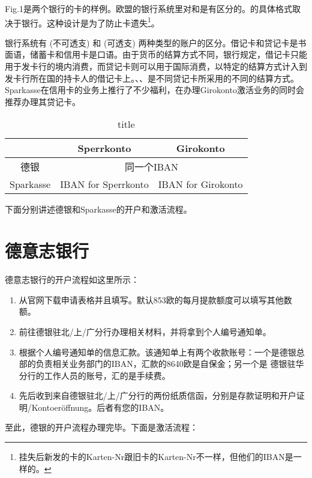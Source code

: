 Fig.1是两个银行的卡的样例。欧盟的银行系统里对和是有区分的。的具体格式取决于银行。这种设计是为了防止卡遗失\footnote{挂失后新发的卡的Karten-Nr跟旧卡的Karten-Nr不一样，但他们的IBAN是一样的。}。

银行系统有 (不可透支) 和 (可透支) 两种类型的账户的区分。借记卡和贷记卡是书面语，储蓄卡和信用卡是口语。由于货币的结算方式不同，银行规定，借记卡只能用于发卡行的境内消费，而贷记卡则可以用于国际消费，以特定的结算方式计入到发卡行所在国的持卡人的借记卡上。、、是不同贷记卡所采用的不同的结算方式。Sparkasse在信用卡的业务上推行了不少福利，在办理Girokonto激活业务的同时会推荐办理其贷记卡。

\begin{table}[h]
\centering
\caption{title}
\begin{tabular}{|c|c|c|}
\hline
&Sperrkonto&Girokonto\\
\hline
德银&\multicolumn{2}{c|}{同一个IBAN}\\
\hline
Sparkasse&IBAN for Sperrkonto&IBAN for Girokonto\\
\hline
\end{tabular}
\end{table}

下面分别讲述德银和Sparkasse的开户和激活流程。

\section{德意志银行}

德意志银行的开户流程如这里所示：

\begin{enumerate}
  \item 从官网下载申请表格并且填写。默认853欧的每月提款额度可以填写其他数额。
  \item 前往德银驻北/上/广分行办理相关材料，并将拿到个人编号通知单。
  \item 根据个人编号通知单的信息汇款。该通知单上有两个收款账号：一个是德银总部的负责相关业务部门的IBAN，汇款的8640欧是自保金；另一个是 德银驻华分行的工作人员的账号，汇的是手续费。
  \item 先后收到来自德银驻北/上/广分行的两份纸质信函，分别是存款证明和开户证明/Kontoeröffnung。后者有您的IBAN。
\end{enumerate}

至此，德银的开户流程办理完毕。下面是激活流程：

